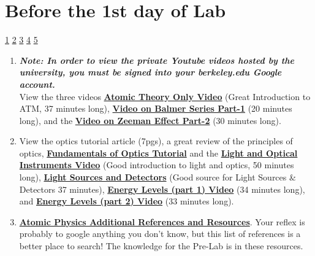 \documentclass{../lab}
\begin{document}
\section{Before the 1st day of Lab}

\signatures \hyperlink{Preparation}{ 1} \hyperlink{Peak Finding}{ 2} \hyperlink{Additional Questions}{ 3} \hyperlink{Zeeman Picture}{ 4} \hyperlink{Zeeman Splitting}{ 5}

\begin{enumerate}
    \item \emph{\textbf{Note: In order to view the private Youtube videos hosted by the university, you must be signed into your berkeley.edu Google account.}} \\
    View the three videos \href{http://youtu.be/iJ\_4ygOaE7A}{\textbf{Atomic Theory Only Video}} (Great Introduction to ATM, 37 minutes long), \href{http://youtu.be/M41IKkUAG-A}{\textbf{Video on Balmer Series Part-1}} (20 minutes long), and the \href{http://youtu.be/-l2chO5SLew}{\textbf{Video on Zeeman Effect Part-2}} (30 minutes long).



    \item View the optics tutorial article (7pgs), a great review of the principles of optics, \href{https://berkeley-physics111b.github.io/assets/pdf/oldwebsitestructure/QIE/fundamental-Optics.pdf}{\textbf{Fundamentals of Optics Tutorial}}\textbf{ }and the \href{http://youtu.be/zUGBt5vc5FA}{\textbf{Light and Optical Instruments Video}}\textbf{ }(Good introduction to light and optics, 50 minutes long), \href{http://youtu.be/lQKLakISoBA}{\textbf{Light Sources and Detectors}} (Good source for Light Sources \& Detectors 37 minutes), \href{http://youtu.be/wyBOVjU5bBQ}{\textbf{Energy Levels (part 1) Video}} (34 minutes long), and \href{http://youtu.be/Eypw0DmVBxk}{\textbf{Energy Levels (part 2) Video}} (33 minutes long).

    \item
    \href{https://drive.google.com/file/d/1nFMhrUp6M223EXBNZx-VVMmRQJDwkZeJ/view?usp=drive_link}{\textbf{Atomic Physics Additional References and Resources}}. Your reflex is probably to google anything you don't know, but this list of references is a better place to search! The knowledge for the Pre-Lab is in these resources.


\end{enumerate}
\end{document}
